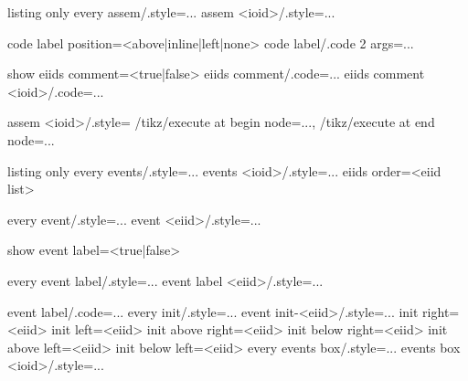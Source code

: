 \documentclass[a4paper]{article}
\begin{document}
\begin{tcblisting}{listing only}
every assem/.style={...}
assem <ioid>/.style={...}

code label position=<above|inline|left|none> %
code label/.code 2 args={...} %

show eiids comment=<true|false> %
eiids comment/.code={...} %
eiids comment <ioid>/.code={...}

assem <ioid>/.style={
  /tikz/execute at begin node={...},
  /tikz/execute at end node={...}
}
\end{tcblisting}


\begin{tcblisting}{listing only}
every events/.style={...} %
events <ioid>/.style={...}
eiids order={<eiid list>}

every event/.style={...} %
event <eiid>/.style={...}

show event label=<true|false> %

every event label/.style={...} %
event label <eiid>/.style={...}

event label/.code={...} %
every init/.style={...} %
event init-<eiid>/.style={...}
init right=<eiid>
init left=<eiid>
init above right=<eiid>
init below right=<eiid>
init above left=<eiid>
init below left=<eiid>
every events box/.style={...} %
events box <ioid>/.style={...}
\end{tcblisting}
\end{document}
